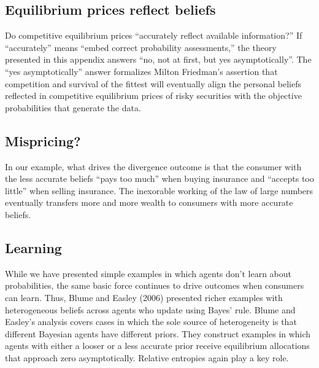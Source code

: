 




\subsection{Equilibrium prices reflect beliefs}

Do competitive equilibrium prices ``accurately reflect available information?''  If ``accurately'' means ``embed correct probability assessments,''
the theory presented in this appendix answers ``no, not at first, but yes asymptotically''.  The ``yes asymptotically'' answer formalizes
Milton Friedman's assertion that competition and survival of the fittest will eventually align the personal beliefs reflected in competitive equilibrium prices of
risky securities with the objective probabilities that generate the data.


\subsection{Mispricing?}

In our example, what drives the divergence outcome is that the consumer with the less accurate beliefs ``pays too much'' when buying  insurance
and ``accepts too little'' when selling insurance.  The inexorable working of the law of large numbers eventually transfers more and more wealth to  consumers with  more
accurate beliefs.

\subsection{Learning}

While we have presented simple examples in which agents don't learn about probabilities, the same basic force  continues to drive outcomes
when consumers can learn.
Thus, Blume and Easley (2006) presented richer examples with heterogeneous beliefs across agents who
 update  using Bayes' rule.
 Blume and Easley's  analysis covers cases  in which the sole source of heterogeneity is that different Bayesian
agents have different priors.  They construct examples in which    agents with either
 a looser  or a less accurate prior receive  equilibrium allocations that approach zero asymptotically.
 Relative entropies again play a key role.



